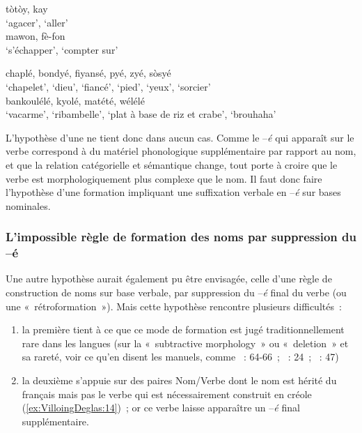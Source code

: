 \documentclass[output=paper]{langsci/langscibook}
\begin{document}
  \ex\label{ex:VilloingDeglas:12b} \gll tòtòy, kay\\
  `agacer', `aller'\\
  \ex\label{ex:VilloingDeglas:12c} \gll mawon, fè-fon\\
  `s'échapper', {`compter sur'}\\
  \z

\ex\label{ex:VilloingDeglas:13}
  \ea\label{ex:VilloingDeglas:13a} \gll chaplé, bondyé, fiyansé, pyé, zyé, sòsyé\\
  `chapelet', `dieu', `fiancé', `pied', `yeux', `sorcier'\\

 \ex\label{ex:VilloingDeglas:13b} \gll bankoulélé, kyolé, matété, wélélé\\
  `vacarme', `ribambelle', {`plat à base de riz et crabe'}, `brouhaha'\\
 \z
\z

L'hypothèse d'une  ne tient donc dans aucun cas. Comme le
--\emph{é} qui apparaît sur le verbe correspond à du matériel
phonologique supplémentaire par rapport au nom, et que la relation
catégorielle et sémantique change, tout porte à croire que le verbe est
morphologiquement plus complexe que le nom. Il faut donc faire
l'hypothèse d'une formation impliquant une suffixation verbale en
--\emph{é} sur bases nominales.

\subsubsection{L'impossible règle de formation des noms par suppression
du
--é}\label{subsubsection:VilloingDeglas:limpossible-ruxe8gle-de-formation-des-noms-par-suppression-du-é}

Une autre hypothèse aurait également pu être envisagée, celle d'une
règle de construction de noms sur base verbale, par suppression du
--\emph{é} final du verbe (ou une «~rétroformation~»). Mais cette
hypothèse rencontre plusieurs difficultés~:

\begin{enumerate}[label=(\alph*)]
\item la première tient à ce que ce mode de formation est jugé
traditionnellement rare dans les langues %
(sur la «~subtractive morphology~» ou «~deletion~» et sa rareté, voir ce qu'en disent les
manuels, comme %
\citealt{Anderson92}%
%
~: 64-66~; %
\citealt{Haspelmath2002}%
%
~: 24~; 
\citealt{Fradin2003}%
%
~: 47)
%


\item la deuxième s'appuie sur des paires Nom/Verbe dont le nom est
hérité du français mais pas le verbe qui est nécessairement construit en
créole (\ref{ex:VilloingDeglas:14})~; or ce verbe laisse apparaître un --\emph{é} final
supplémentaire.
\end{enumerate}
\end{document}
